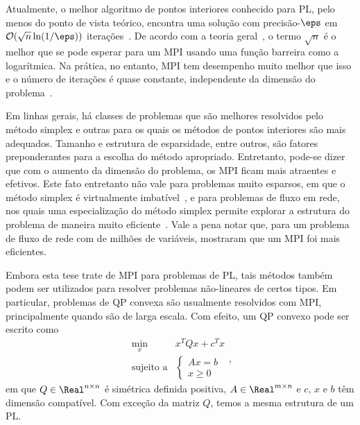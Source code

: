 Atualmente, o melhor algoritmo de pontos interiores conhecido para \ac{PL}, pelo menos do ponto de vista teórico, 
encontra uma solução com precisão-$\eps$ em $\Oset(\sqrt{n}\ln(1/\eps))$
iterações~\cite{Renegar:1988cr}.
De acordo com a teoria geral~\cite[Capítulo 4]{Nesterov:2003wi}, o termo
$\sqrt{n}$  é o melhor que se pode esperar para um \ac{MPI} usando uma função barreira como a
logarítmica. Na prática, no entanto, \ac{MPI} tem desempenho muito melhor que
isso e o número de iterações é quase constante, independente da dimensão do
problema~\cite{Colombo:2008ia}.

Em linhas gerais, há classes de problemas que são melhores resolvidos
pelo método simplex e outras para os quais os métodos de pontos interiores são mais
adequados. Tamanho e estrutura de esparsidade, entre outros, são fatores
preponderantes para a escolha do  método apropriado. Entretanto, pode-se dizer
que com o aumento da dimensão do problema, os \ac{MPI} ficam mais atraentes e
efetivos. Este fato entretanto não vale para problemas muito esparsos, em que o
método simplex é virtualmente imbatível~\cite{Hall:2005vw}, e para problemas
de fluxo em rede, nos quais uma especialização do método simplex permite
explorar a estrutura do problema de maneira muito
eficiente~\cite{Nemhauser:Integer-and-combinatorial:1988s}. Vale a pena notar
que, para um problema de fluxo de rede com de milhões de variáveis, 
\textcite{Resende:1993hh} mostraram que um \ac{MPI} foi mais
eficientes.



  

Embora esta tese trate de \ac{MPI} para problemas de \ac{PL}, tais
métodos também podem ser utilizados para resolver problemas não-lineares
de certos tipos.
Em particular, problemas de  \ac{QP} convexa
são usualmente resolvidos com \ac{MPI}, principalmente
quando são de larga escala. Com efeito, um \ac{QP} convexo pode ser  escrito como
\begin{equation*}
	\begin{array}{lc}
\displaystyle \min_{x} & x^TQx + c^Tx \\
\text{sujeito a} &\begin{cases} Ax = b \\
				 x \geq 0	
				 \end{cases}
\end{array},
\label{eq:QP}
\end{equation*}
em que $Q\in\Real^{n\times n}$ é simétrica definida positiva, $A\in \Real^{m\times
n}$ e $c$, $x$ e $b$ têm dimensão compatível. Com exceção da matriz $Q$, temos a
mesma estrutura de um \ac{PL}.



